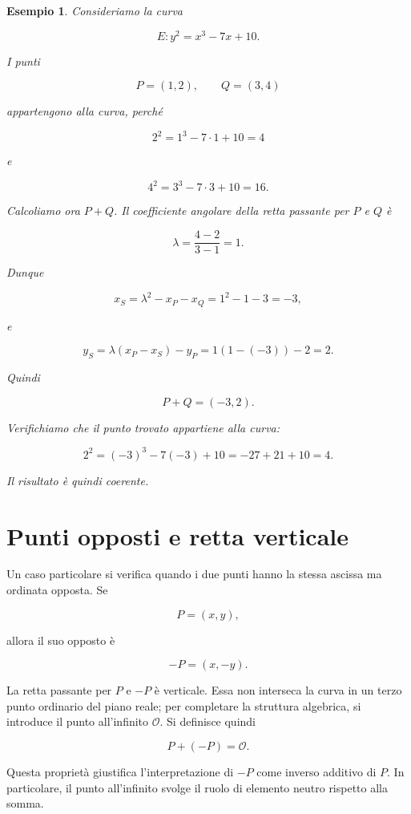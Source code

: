 \documentclass[12pt,a4paper,oneside]{report}
\newtheorem{example}{Esempio}[chapter]
\begin{document}
\begin{example}
Consideriamo la curva

\[
E: y^2 = x^3 - 7x + 10.
\]

I punti

\[
P=(1,2), \qquad Q=(3,4)
\]

appartengono alla curva, perché

\[
2^2 = 1^3 -7\cdot 1 +10 = 4
\]

e

\[
4^2 = 3^3 -7\cdot 3 +10 = 16.
\]

Calcoliamo ora \(P+Q\). Il coefficiente angolare della retta passante per \(P\) e \(Q\) è

\[
\lambda = \frac{4-2}{3-1} = 1.
\]

Dunque

\[
x_S = \lambda^2 - x_P - x_Q = 1^2 -1-3 = -3,
\]

e

\[
y_S = \lambda(x_P-x_S)-y_P = 1(1-(-3))-2 = 2.
\]

Quindi

\[
P+Q = (-3,2).
\]

Verifichiamo che il punto trovato appartiene alla curva:

\[
2^2 = (-3)^3 -7(-3)+10 = -27+21+10 = 4.
\]

Il risultato è quindi coerente.
\end{example}

\section{Punti opposti e retta verticale}

Un caso particolare si verifica quando i due punti hanno la stessa ascissa ma ordinata opposta. Se

\[
P=(x,y),
\]

allora il suo opposto è

\[
-P=(x,-y).
\]

La retta passante per \(P\) e \(-P\) è verticale. Essa non interseca la curva in un terzo punto ordinario del piano reale; per completare la struttura algebrica, si introduce il punto all'infinito \(\mathcal{O}\). Si definisce quindi

\begin{equation}
    P + (-P) = \mathcal{O}.
\end{equation}

Questa proprietà giustifica l'interpretazione di \(-P\) come inverso additivo di \(P\). In particolare, il punto all'infinito svolge il ruolo di elemento neutro rispetto alla somma.
\end{document}
